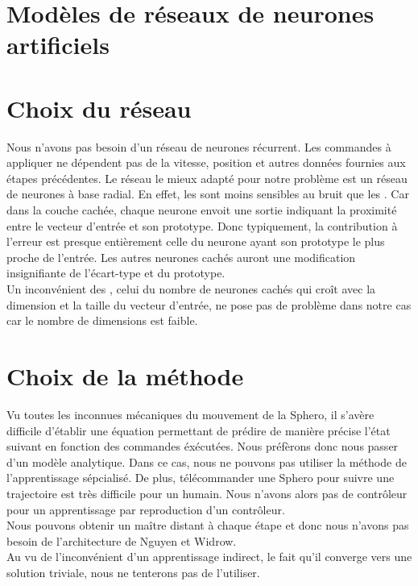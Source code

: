 \documentclass[12pt,a4paper,oneside, titlepage]{article}
\begin{document}


\tableofcontents
\newpage


\section{Modèles de réseaux de neurones artificiels}
\terminologie










\section{Choix du réseau}
Nous n'avons pas besoin d'un réseau de neurones récurrent.
Les commandes à appliquer ne dépendent pas de la vitesse, position et autres données fournies aux étapes précédentes.
Le réseau le mieux adapté pour notre problème est un réseau de neurones à base radial.
En effet, les \rbf sont moins sensibles au bruit que les \mlp \cite{adversarial,Gauthier}.%
Car dans la couche cachée, chaque neurone envoit une sortie indiquant la proximité entre le vecteur d'entrée et son prototype.
Donc typiquement, la contribution à l'erreur est presque entièrement celle du neurone ayant son prototype le plus proche de l'entrée.
Les autres neurones cachés auront une modification insignifiante de l'écart-type et du prototype.\\

Un inconvénient des \rbf, celui du nombre de neurones cachés qui croît avec la dimension et la taille du vecteur d'entrée, ne pose pas de problème dans notre cas car le nombre de dimensions est faible.



\section{Choix de la méthode}
Vu toutes les inconnues mécaniques du mouvement de la Sphero, il s'avère difficile d'établir une équation permettant de prédire de manière précise l'état suivant en fonction des commandes éxécutées.
Nous préfèrons donc nous passer d'un modèle analytique.
Dans ce cas, nous ne pouvons pas utiliser la méthode de l'apprentissage sépcialisé.
De plus, télécommander une Sphero pour suivre une trajectoire est très difficile pour un humain.
Nous n'avons alors pas de contrôleur pour un apprentissage par reproduction d'un contrôleur.\\
Nous pouvons obtenir un maître distant à chaque étape et donc nous n'avons pas besoin de l'architecture de Nguyen et Widrow.\\
Au vu de l'inconvénient d'un apprentissage indirect, le fait qu'il converge vers une solution triviale, nous ne tenterons pas de l'utiliser.\\
\end{document}
